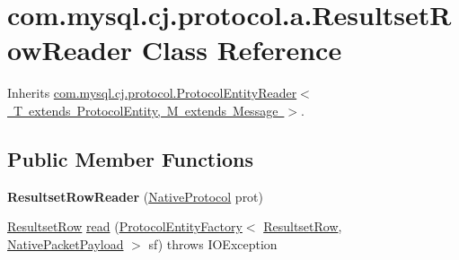 \hypertarget{classcom_1_1mysql_1_1cj_1_1protocol_1_1a_1_1_resultset_row_reader}{}\section{com.\+mysql.\+cj.\+protocol.\+a.\+Resultset\+Row\+Reader Class Reference}
\label{classcom_1_1mysql_1_1cj_1_1protocol_1_1a_1_1_resultset_row_reader}


Inherits \mbox{\hyperlink{interfacecom_1_1mysql_1_1cj_1_1protocol_1_1_protocol_entity_reader}{com.\+mysql.\+cj.\+protocol.\+Protocol\+Entity\+Reader$<$ T extends Protocol\+Entity, M extends Message $>$}}.

\subsection*{Public Member Functions}
\begin{DoxyCompactItemize}
\item 
\mbox{\label{classcom_1_1mysql_1_1cj_1_1protocol_1_1a_1_1_resultset_row_reader_a3f790668961e51d87c8fa296e0c164a7}} 
{\bfseries Resultset\+Row\+Reader} (\mbox{\hyperlink{classcom_1_1mysql_1_1cj_1_1protocol_1_1a_1_1_native_protocol}{Native\+Protocol}} prot)
\item 
\mbox{\hyperlink{interfacecom_1_1mysql_1_1cj_1_1protocol_1_1_resultset_row}{Resultset\+Row}} \mbox{\hyperlink{classcom_1_1mysql_1_1cj_1_1protocol_1_1a_1_1_resultset_row_reader_a573b457be8bdc0762d3dac20eb23ca05}{read}} (\mbox{\hyperlink{interfacecom_1_1mysql_1_1cj_1_1protocol_1_1_protocol_entity_factory}{Protocol\+Entity\+Factory}}$<$ \mbox{\hyperlink{interfacecom_1_1mysql_1_1cj_1_1protocol_1_1_resultset_row}{Resultset\+Row}}, \mbox{\hyperlink{classcom_1_1mysql_1_1cj_1_1protocol_1_1a_1_1_native_packet_payload}{Native\+Packet\+Payload}} $>$ sf)  throws I\+O\+Exception 
\end{DoxyCompactItemize}
